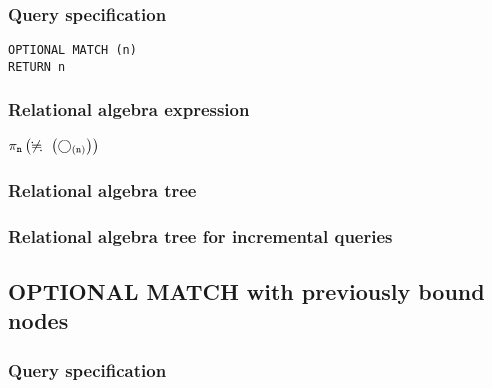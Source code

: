\subsubsection*{Query specification}

\begin{lstlisting}
OPTIONAL MATCH (n)
RETURN n
\end{lstlisting}

\subsubsection*{Relational algebra expression}

$\projection{\var{n}} \left(\alldifferent{} \left(\getvertices{n}{}\right)\right)$

\subsubsection*{Relational algebra tree}


\subsubsection*{Relational algebra tree for incremental queries}


\subsection{OPTIONAL MATCH with previously bound nodes}

\subsubsection*{Query specification}

